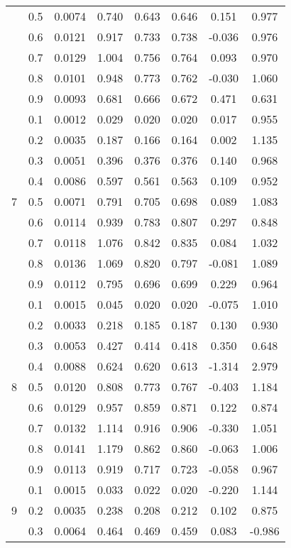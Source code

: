 \documentclass[11pt,a4paper]{report}
\begin{document}
\begin{longtable}{ | c | c || c | c | c | c | c | c | }
 & 0.5 & 0.0074 & 0.740 & 0.643 & 0.646 & 0.151 & 0.977 \\
 & 0.6 & 0.0121 & 0.917 & 0.733 & 0.738 & -0.036 & 0.976 \\
 & 0.7 & 0.0129 & 1.004 & 0.756 & 0.764 & 0.093 & 0.970 \\
 & 0.8 & 0.0101 & 0.948 & 0.773 & 0.762 & -0.030 & 1.060 \\
 & 0.9 & 0.0093 & 0.681 & 0.666 & 0.672 & 0.471 & 0.631 \\
 \hline
\multirow{9}{*}{7} & 0.1 & 0.0012 & 0.029 & 0.020 & 0.020 & 0.017 & 0.955 \\
 & 0.2 & 0.0035 & 0.187 & 0.166 & 0.164 & 0.002 & 1.135 \\
 & 0.3 & 0.0051 & 0.396 & 0.376 & 0.376 & 0.140 & 0.968 \\
 & 0.4 & 0.0086 & 0.597 & 0.561 & 0.563 & 0.109 & 0.952 \\
 & 0.5 & 0.0071 & 0.791 & 0.705 & 0.698 & 0.089 & 1.083 \\
 & 0.6 & 0.0114 & 0.939 & 0.783 & 0.807 & 0.297 & 0.848 \\
 & 0.7 & 0.0118 & 1.076 & 0.842 & 0.835 & 0.084 & 1.032 \\
 & 0.8 & 0.0136 & 1.069 & 0.820 & 0.797 & -0.081 & 1.089 \\
 & 0.9 & 0.0112 & 0.795 & 0.696 & 0.699 & 0.229 & 0.964 \\
 \hline
\multirow{9}{*}{8} & 0.1 & 0.0015 & 0.045 & 0.020 & 0.020 & -0.075 & 1.010 \\
 & 0.2 & 0.0033 & 0.218 & 0.185 & 0.187 & 0.130 & 0.930 \\
 & 0.3 & 0.0053 & 0.427 & 0.414 & 0.418 & 0.350 & 0.648 \\
 & 0.4 & 0.0088 & 0.624 & 0.620 & 0.613 & -1.314 & 2.979 \\
 & 0.5 & 0.0120 & 0.808 & 0.773 & 0.767 & -0.403 & 1.184 \\
 & 0.6 & 0.0129 & 0.957 & 0.859 & 0.871 & 0.122 & 0.874 \\
 & 0.7 & 0.0132 & 1.114 & 0.916 & 0.906 & -0.330 & 1.051 \\
 & 0.8 & 0.0141 & 1.179 & 0.862 & 0.860 & -0.063 & 1.006 \\
 & 0.9 & 0.0113 & 0.919 & 0.717 & 0.723 & -0.058 & 0.967 \\
 \hline
\multirow{9}{*}{9} & 0.1 & 0.0015 & 0.033 & 0.022 & 0.020 & -0.220 & 1.144 \\
 & 0.2 & 0.0035 & 0.238 & 0.208 & 0.212 & 0.102 & 0.875 \\
 & 0.3 & 0.0064 & 0.464 & 0.469 & 0.459 & 0.083 & -0.986 \\

\end{longtable}
\end{document}
